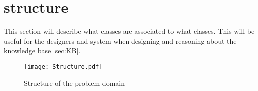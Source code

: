 \section{structure}\label{sec:structure}

This section will describe what classes are associated to what classes. This will be useful for the designers and system when designing and reasoning about the knowledge base \cref{sec:KB}.

\begin{figure}
 \centering 
 \texttt{[image: Structure.pdf]}
 \caption{Structure of the problem domain}
\end{figure}

